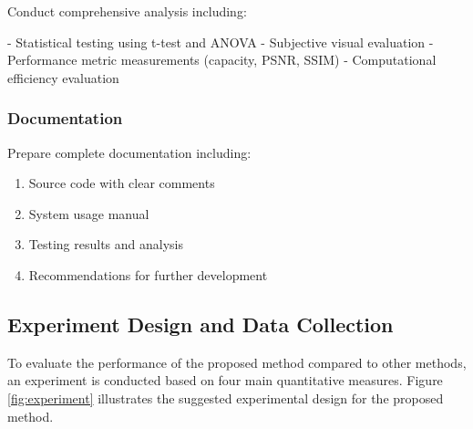 \documentclass{ittelkom}
\begin{document}
Conduct comprehensive analysis including:

- Statistical testing using t-test and ANOVA
- Subjective visual evaluation
- Performance metric measurements (capacity, PSNR, SSIM)
- Computational efficiency evaluation

\subsubsection{Documentation}

Prepare complete documentation including:

\begin{enumerate}
    \item Source code with clear comments
    \item System usage manual
    \item Testing results and analysis
    \item Recommendations for further development
\end{enumerate}

\subsection{Experiment Design and Data Collection}

To evaluate the performance of the proposed method compared to other methods,
an experiment is conducted based on four main quantitative measures. Figure
\ref{fig:experiment} illustrates the suggested experimental design for the
proposed method.







\end{document}
